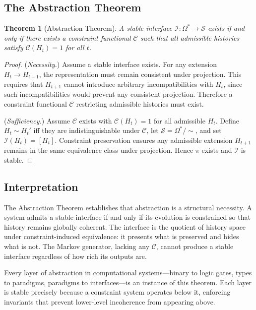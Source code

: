 \documentclass[12pt, a4paper]{article}
\theoremstyle{plain}
\newtheorem{theorem}{Theorem}[section]
\theoremstyle{definition}
\theoremstyle{remark}
\begin{document}
\subsection{The Abstraction Theorem}

\begin{theorem}[Abstraction Theorem]
\label{thm:abstraction}
A stable interface $\mathcal{I} : \Omega^* \to \mathcal{S}$ exists if and only if there exists a constraint functional $\mathcal{C}$ such that all admissible histories satisfy $\mathcal{C}(H_t) = 1$ for all $t$.
\end{theorem}

\begin{proof}
(\textit{Necessity.}) Assume a stable interface exists. For any extension $H_t \to H_{t+1}$, the representation must remain consistent under projection. This requires that $H_{t+1}$ cannot introduce arbitrary incompatibilities with $H_t$, since such incompatibilities would prevent any consistent projection. Therefore a constraint functional $\mathcal{C}$ restricting admissible histories must exist.

(\textit{Sufficiency.}) Assume $\mathcal{C}$ exists with $\mathcal{C}(H_t) = 1$ for all admissible $H_t$. Define $H_t \sim H_t'$ iff they are indistinguishable under $\mathcal{C}$, let $\mathcal{S} = \Omega^*/{\sim}$, and set $\mathcal{I}(H_t) = [H_t]$. Constraint preservation ensures any admissible extension $H_{t+1}$ remains in the same equivalence class under projection. Hence $\pi$ exists and $\mathcal{I}$ is stable.
\end{proof}

\subsection{Interpretation}

The Abstraction Theorem establishes that abstraction is a structural necessity. A system admits a stable interface if and only if its evolution is constrained so that history remains globally coherent. The interface is the quotient of history space under constraint-induced equivalence: it presents what is preserved and hides what is not. The Markov generator, lacking any $\mathcal{C}$, cannot produce a stable interface regardless of how rich its outputs are.

Every layer of abstraction in computational systems---binary to logic gates, types to paradigms, paradigms to interfaces---is an instance of this theorem. Each layer is stable precisely because a constraint system operates below it, enforcing invariants that prevent lower-level incoherence from appearing above.
\end{document}
